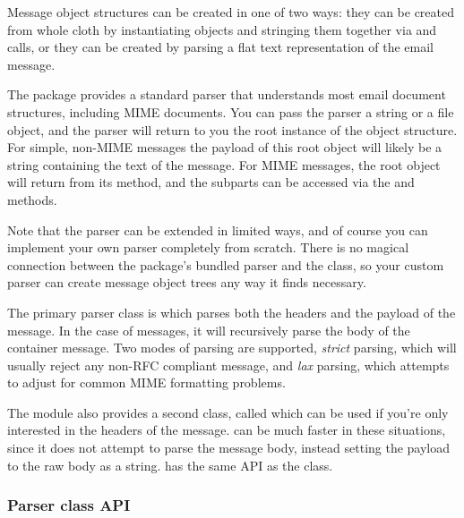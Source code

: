 
Message object structures can be created in one of two ways: they can be
created from whole cloth by instantiating  objects and
stringing them together via  and
 calls, or they can be created by parsing a flat text
representation of the email message.

The  package provides a standard parser that understands
most email document structures, including MIME documents.  You can
pass the parser a string or a file object, and the parser will return
to you the root  instance of the object structure.  For
simple, non-MIME messages the payload of this root object will likely
be a string containing the text of the message.  For MIME
messages, the root object will return  from its
 method, and the subparts can be accessed via
the  and  methods.

Note that the parser can be extended in limited ways, and of course
you can implement your own parser completely from scratch.  There is
no magical connection between the  package's bundled
parser and the  class, so your custom parser can create
message object trees any way it finds necessary.

The primary parser class is  which parses both the
headers and the payload of the message.  In the case of
 messages, it will recursively parse the body of
the container message.  Two modes of parsing are supported,
\emph{strict} parsing, which will usually reject any non-RFC compliant
message, and \emph{lax} parsing, which attempts to adjust for common
MIME formatting problems.

The  module also provides a second class, called
 which can be used if you're only interested in
the headers of the message.  can be much faster in
these situations, since it does not attempt to parse the message body,
instead setting the payload to the raw body as a string.
 has the same API as the  class.

\subsubsection{Parser class API}

